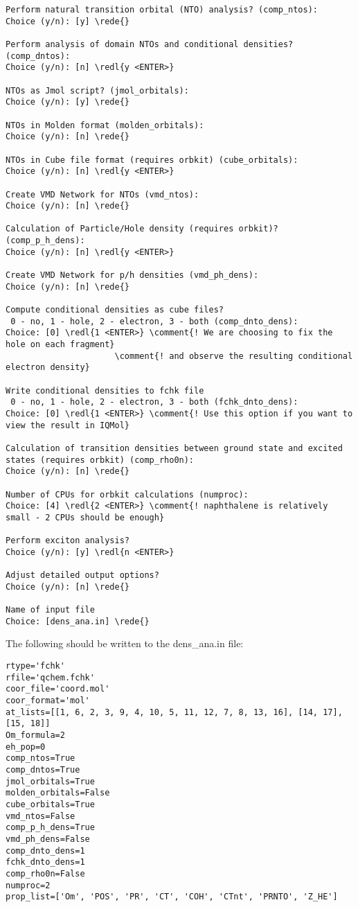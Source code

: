 \documentclass[DIV=12,headings=normal]{scrartcl}
\newcommand{\comment}[1]{\textcolor{blue}{#1}}
\newcommand{\redl}[1]{{\textcolor{red}{\texttt{#1}}}}
\newcommand{\rede}[1]{\redl{#1 <ENTER>}}
\begin{document}
\begin{Verbatim}[commandchars=\\\{\}]
Perform natural transition orbital (NTO) analysis? (comp_ntos):
Choice (y/n): [y] \rede{}

Perform analysis of domain NTOs and conditional densities? (comp_dntos):
Choice (y/n): [n] \redl{y <ENTER>}

NTOs as Jmol script? (jmol_orbitals):
Choice (y/n): [y] \rede{}

NTOs in Molden format (molden_orbitals):
Choice (y/n): [n] \rede{}

NTOs in Cube file format (requires orbkit) (cube_orbitals):
Choice (y/n): [n] \redl{y <ENTER>}

Create VMD Network for NTOs (vmd_ntos):
Choice (y/n): [n] \rede{}

Calculation of Particle/Hole density (requires orbkit)? (comp_p_h_dens):
Choice (y/n): [n] \redl{y <ENTER>}

Create VMD Network for p/h densities (vmd_ph_dens):
Choice (y/n): [n] \rede{}

Compute conditional densities as cube files?
 0 - no, 1 - hole, 2 - electron, 3 - both (comp_dnto_dens):
Choice: [0] \redl{1 <ENTER>} \comment{! We are choosing to fix the hole on each fragment}
                      \comment{! and observe the resulting conditional electron density}

Write conditional densities to fchk file
 0 - no, 1 - hole, 2 - electron, 3 - both (fchk_dnto_dens):
Choice: [0] \redl{1 <ENTER>} \comment{! Use this option if you want to view the result in IQMol}

Calculation of transition densities between ground state and excited states (requires orbkit) (comp_rho0n):
Choice (y/n): [n] \rede{}

Number of CPUs for orbkit calculations (numproc):
Choice: [4] \redl{2 <ENTER>} \comment{! naphthalene is relatively small - 2 CPUs should be enough} 

Perform exciton analysis?
Choice (y/n): [y] \redl{n <ENTER>}

Adjust detailed output options?
Choice (y/n): [n] \rede{}

Name of input file
Choice: [dens_ana.in] \rede{} 
\end{Verbatim}
\normalsize

The following should be written to the dens{\_}ana.in file:
\scriptsize
\begin{Verbatim}[commandchars=\\\{\}]
rtype='fchk'
rfile='qchem.fchk'
coor_file='coord.mol'
coor_format='mol'
at_lists=[[1, 6, 2, 3, 9, 4, 10, 5, 11, 12, 7, 8, 13, 16], [14, 17], [15, 18]]
Om_formula=2
eh_pop=0
comp_ntos=True
comp_dntos=True
jmol_orbitals=True
molden_orbitals=False
cube_orbitals=True
vmd_ntos=False
comp_p_h_dens=True
vmd_ph_dens=False
comp_dnto_dens=1
fchk_dnto_dens=1
comp_rho0n=False
numproc=2
prop_list=['Om', 'POS', 'PR', 'CT', 'COH', 'CTnt', 'PRNTO', 'Z_HE']
\end{Verbatim}
\normalsize
\end{document}
